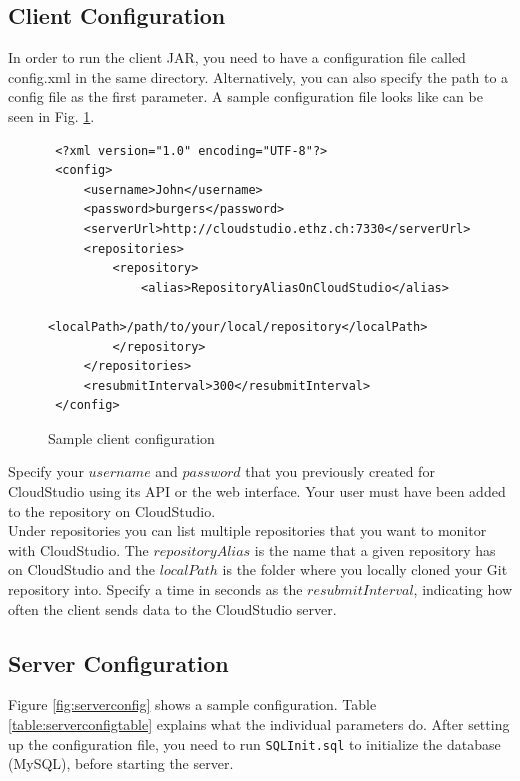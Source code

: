 \subsection{Client Configuration}

In order to run the client JAR, you need to have a configuration file called config.xml in the same directory. Alternatively, you can also specify the path to a config file as the first parameter. A sample configuration file looks like can be seen in Fig. \ref{fig:clientconfig}. \\

\begin{figure}[h!]
\begin{lstlisting}
 <?xml version="1.0" encoding="UTF-8"?>
 <config>
     <username>John</username>
     <password>burgers</password>
     <serverUrl>http://cloudstudio.ethz.ch:7330</serverUrl>
     <repositories>
         <repository>
             <alias>RepositoryAliasOnCloudStudio</alias>
             <localPath>/path/to/your/local/repository</localPath>
         </repository>
     </repositories>
     <resubmitInterval>300</resubmitInterval>
 </config>
\end{lstlisting}
  \centering
  \caption{Sample client configuration}
  \label{fig:clientconfig}
\end{figure}


Specify your $username$ and $password$ that you previously created for CloudStudio using its API or the web interface. Your user must have been added to the repository on CloudStudio. \\

Under repositories you can list multiple repositories that you want to monitor with CloudStudio. The $repositoryAlias$ is the name that a given repository has on CloudStudio and the $localPath$ is the folder where you locally cloned your Git repository into. Specify a time in seconds as the $resubmitInterval$, indicating how often the client sends data to the CloudStudio server.


\subsection{Server Configuration}

Figure \ref{fig:serverconfig} shows a sample configuration. Table \ref{table:serverconfigtable} explains what the individual parameters do. After setting up the configuration file, you need to run \texttt{SQLInit.sql} to initialize the database (MySQL), before starting the server.

